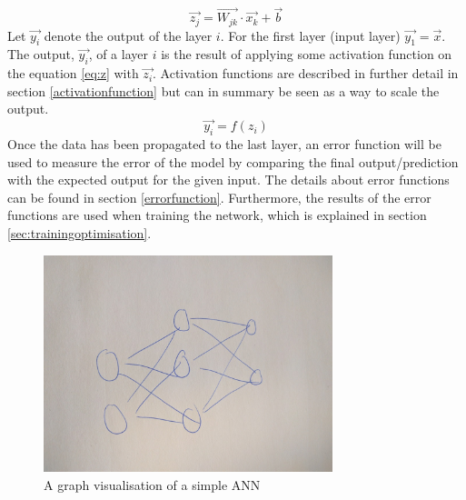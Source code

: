 \begin{equation}\label{eq:z}
    \vec{z_j} = \vec{W_{jk}} \cdot \vec{x_k} + \vec{b}
\end{equation}
Let $\vec{y_i}$ denote the output of the layer $i$. For the first layer (input layer) $\vec{y_1}=\vec{x}$. The output, $\vec{y_i}$, of a layer $i$ is the result of applying some activation function on the equation \ref{eq:z} with $\vec{z_i}$. Activation functions are described in further detail in section \ref{activationfunction} but can in summary be seen as a way to scale the output.
\begin{equation}
    \vec{y_i} = f(z_i)
\end{equation}
Once the data has been propagated to the last layer, an error function will be used to measure the error of the model by comparing the final output/prediction with the expected output for the given input. The details about error functions can be found in section \ref{errorfunction}. Furthermore, the results of the error functions are used when training the network, which is explained in section \ref{sec:trainingoptimisation}. 

\begin{figure}[h]
    \centering
    \includegraphics[width=0.75\textwidth]{figure/ann/ann}
    \caption{A graph visualisation of a simple ANN}
    \label{fig:simple_ann}
\end{figure}

